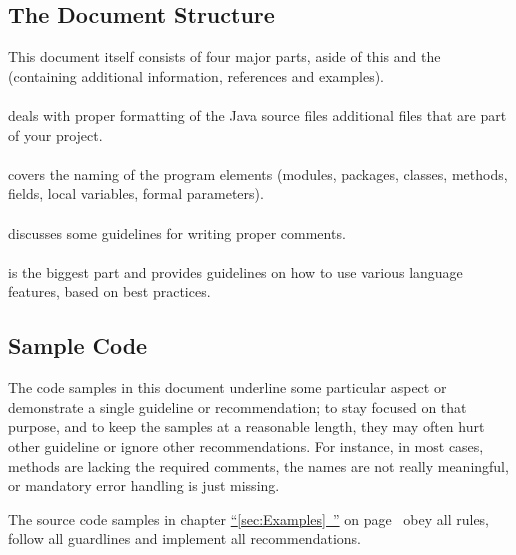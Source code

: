 \documentclass[11pt,a4paper, titlepage, parskip=half, headsepline, footsepline, cleardoublepage=current, headheight=1cm]{scrbook}
\newcommand*{\tqfullvref}[1]{\hyperref[{#1}]{“\ref*{#1}~\nameref*{#1}”} on page~\pageref{#1}}
\begin{document}
\subsection{The Document Structure}
This document itself consists of four major parts, aside of this  and the  (containing additional information, references and examples).

\paragraph{} deals with proper formatting of the Java source files additional files that are part of your project.

\paragraph{} covers the naming of the program elements (modules, packages, classes, methods, fields, local variables, formal parameters).

\paragraph{} discusses some guidelines for writing proper comments.

\paragraph{} is the biggest part and provides guidelines on how to use various language features, based on best practices.

\subsection{Sample Code}
The code samples in this document underline some particular aspect or demonstrate a single guideline or recommendation; to stay focused on that purpose, and to keep the samples at a reasonable length, they may often hurt other guideline or ignore other recommendations. For instance, in most cases, methods are lacking the required comments, the names are not really meaningful, or mandatory error handling is just missing.

The source code samples in chapter \tqfullvref{sec:Examples} obey all rules, follow all guardlines and implement all recommendations.
\end{document}
